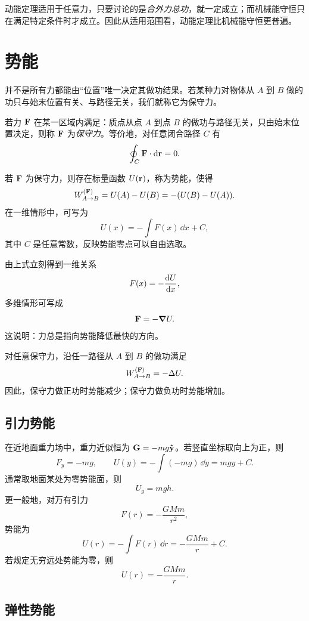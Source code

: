 \begin{remark}
动能定理适用于任意力，只要讨论的是\emph{合外力总功}，就一定成立；而机械能守恒只在满足特定条件时才成立。因此从适用范围看，动能定理比机械能守恒更普遍。
\end{remark}

\section{势能}\label{sec:potential-energy}

并不是所有力都能由“位置”唯一决定其做功结果。若某种力对物体从 $A$ 到 $B$ 做的功只与始末位置有关、与路径无关，我们就称它为保守力。

\begin{definition}[保守力]
若力 $\vb{F}$ 在某一区域内满足：质点从点 $A$ 到点 $B$ 的做功与路径无关，只由始末位置决定，则称 $\vb{F}$ 为\emph{保守力}。等价地，对任意闭合路径 $C$ 有
\[
\oint_C \vb{F}\cdot\dd\vb{r}=0.
\]
\end{definition}

\begin{definition}[势能函数]
若 $\vb{F}$ 为保守力，则存在标量函数 $U(\vb{r})$，称为势能，使得
\[
W_{A\to B}^{(\vb{F})}=U(A)-U(B)=-(U(B)-U(A)).
\]
在一维情形中，可写为
\[
U(x)=-\int F(x)\,\dd x + C,
\]
其中 $C$ 是任意常数，反映势能零点可以自由选取。
\end{definition}

由上式立刻得到一维关系
\[
F(x)=-\dv{U}{x},
\]
多维情形可写成
\[
\vb{F}=-\grad U.
\]
这说明：力总是指向势能降低最快的方向。

\begin{theorem}[保守力做功与势能变化]
对任意保守力，沿任一路径从 $A$ 到 $B$ 的做功满足
\[
W_{A\to B}^{(\vb{F})}=-\Delta U.
\]
因此，保守力做正功时势能减少；保守力做负功时势能增加。
\end{theorem}

\subsection*{引力势能}

在近地面重力场中，重力近似恒为 $\vb{G}= -mg\vu{y}$。若竖直坐标取向上为正，则
\[
F_y=-mg,
\qquad
U(y)=-\int (-mg)\,\dd y = mgy + C.
\]
通常取地面某处为零势能面，则
\[
U_g=mgh.
\]
更一般地，对万有引力
\[
F(r)=-\frac{GMm}{r^2},
\]
势能为
\[
U(r)=-\int F(r)\,\dd r = -\frac{GMm}{r}+C.
\]
若规定无穷远处势能为零，则
\[
U(r)=-\frac{GMm}{r}.
\]

\subsection*{弹性势能}

